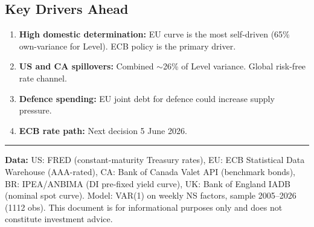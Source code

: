 \documentclass[11pt,a4paper]{article}
\begin{document}
\subsection*{Key Drivers Ahead}
\begin{enumerate}[nosep, leftmargin=1.4em]
    \item \textbf{High domestic determination:} EU curve is the most self-driven (65\% own-variance for Level). ECB policy is the primary driver.
    \item \textbf{US and CA spillovers:} Combined $\sim$26\% of Level variance. Global risk-free rate channel.
    \item \textbf{Defence spending:} EU joint debt for defence could increase supply pressure.
    \item \textbf{ECB rate path:} Next decision 5 June 2026.
\end{enumerate}


\vspace{0.3cm}
\noindent\rule{\textwidth}{0.4pt}
{\footnotesize\color{biggrey} \textbf{Data:} US: FRED (constant-maturity Treasury rates), EU: ECB Statistical Data Warehouse (AAA-rated), CA: Bank of Canada Valet API (benchmark bonds), BR: IPEA/ANBIMA (DI pre-fixed yield curve), UK: Bank of England IADB (nominal spot curve). Model: VAR(1) on weekly NS factors, sample 2005--2026 (1112 obs). This document is for informational purposes only and does not constitute investment advice.}
\end{document}
